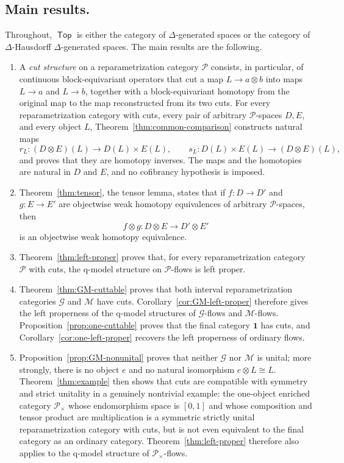 \documentclass[12pt,a4paper]{amsart}
\newcommand{\Top}{\mathop{\mathsf{Top}}}
\newcommand{\Pcat}{\mathcal P}
\newcommand{\G}{\mathcal G}
\newcommand{\M}{\mathcal M}
\theoremstyle{definition}
\begin{document}
\subsection*{Main results.}
Throughout, \(\Top\) is either the category of \(\Delta\)-generated spaces or the category of \(\Delta\)-Hausdorff \(\Delta\)-generated spaces. The main results are the following.
\begin{enumerate}
	\item
	A \emph{cut structure} on a reparametrization category \(\Pcat\) consists, in particular, of continuous block-equivariant operators that cut a map \(L\to a\otimes b\) into maps \(L\to a\) and \(L\to b\), together with a block-equivariant homotopy from the original map to the map reconstructed from its two cuts. For every reparametrization category with cuts, every pair of arbitrary \(\Pcat\)-spaces \(D,E\), and every object \(L\), Theorem~\ref{thm:common-comparison} constructs natural maps
	\[
	r_L:(D\otimes E)(L)\longrightarrow D(L)\times E(L),
	\qquad
	s_L: D(L)\times E(L)\longrightarrow(D\otimes E)(L),
	\]
	and proves that they are homotopy inverses. The maps and the homotopies are natural in \(D\) and \(E\), and no cofibrancy hypothesis is imposed.
	
	\item
	Theorem~\ref{thm:tensor}, the tensor lemma, states that if \(f: D\to D'\) and \(g: E\to E'\) are objectwise weak homotopy equivalences of arbitrary \(\Pcat\)-spaces, then
	\[
	f\otimes g: D\otimes E\longrightarrow D'\otimes E'
	\]
	is an objectwise weak homotopy equivalence.
	
	\item
	Theorem~\ref{thm:left-proper} proves that, for every reparametrization category \(\Pcat\) with cuts, the q-model structure on \(\Pcat\)-flows is left proper.
	
	\item
	Theorem~\ref{thm:GM-cuttable} proves that both interval reparametrization categories \(\G\) and \(\M\) have cuts. Corollary~\ref{cor:GM-left-proper} therefore gives the left properness of the q-model structures of \(\G\)-flows and \(\M\)-flows. Proposition~\ref{prop:one-cuttable} proves that the final category \(\mathbf 1\) has cuts, and Corollary~\ref{cor:one-left-proper} recovers the left properness of ordinary flows.
	
	\item
	Proposition~\ref{prop:GM-nonunital} proves that neither \(\G\) nor \(\M\) is unital; more strongly, there is no object \(e\) and no natural isomorphism \(e\otimes L\cong L\). Theorem~\ref{thm:example} then shows that cuts are compatible with symmetry and strict unitality in a genuinely nontrivial example: the one-object enriched category \(\Pcat_{\times}\) whose endomorphism space is \([0,1]\) and whose composition and tensor product are multiplication is a symmetric strictly unital reparametrization category with cuts, but is not even equivalent to the final category as an ordinary category. Theorem~\ref{thm:left-proper} therefore also applies to the q-model structure of \(\Pcat_{\times}\)-flows.
\end{enumerate}
\end{document}
